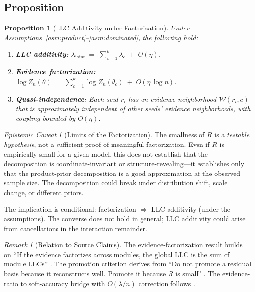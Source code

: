 \documentclass[11pt,a4paper]{article}
\newtheorem{proposition}[theorem]{Proposition}
\theoremstyle{definition}
\theoremstyle{remark}
\newtheorem{remark}[theorem]{Remark}
\newtheorem{caveat}[theorem]{Epistemic Caveat}
\newcommand{\LLC}{\lambda}
\newcommand{\cW}{\mathcal{W}}
\begin{document}
\subsection{Proposition}

\begin{proposition}[LLC Additivity under Factorization]\label{prop:llc-add}
  Under Assumptions~\ref{asm:product}--\ref{asm:dominated}, the following hold:
  \begin{enumerate}[label=(\alph*)]
    \item \textbf{LLC additivity:}
      $\displaystyle\LLC_{\mathrm{joint}} \;=\;
       \sum_{c=1}^{k} \LLC_c \;+\; O(\eta)$.
    \item \textbf{Evidence factorization:}
      $\displaystyle\log Z_n(\theta) \;=\;
       \sum_{c=1}^{k} \log Z_n(\theta_c) \;+\; O(\eta\,\log n)$.
    \item \textbf{Quasi-independence:} Each seed $r_i$ has an evidence
      neighborhood $\cW(r_i, c)$ that is approximately independent of other
      seeds' evidence neighborhoods, with coupling bounded by $O(\eta)$.
  \end{enumerate}
\end{proposition}

\begin{caveat}[Limits of the Factorization]\label{cav:claim1}
  The smallness of $R$ is a \emph{testable hypothesis}, not a sufficient proof
  of meaningful factorization.  Even if $R$ is empirically small for a given
  model, this does not establish that the decomposition is coordinate-invariant
  or structure-revealing---it establishes only that the product-prior
  decomposition is a good approximation at the observed sample size.  The
  decomposition could break under distribution shift, scale change, or
  different priors.

  The implication is conditional: factorization $\Rightarrow$ LLC additivity
  (under the assumptions).  The converse does not hold in general; LLC
  additivity could arise from cancellations in the interaction remainder.
\end{caveat}

\begin{remark}[Relation to Source Claims]\label{rem:claim1-sources}
  The evidence-factorization result builds on ``If the evidence factorizes
  across modules, the global LLC is the sum of module LLCs''
  \cite{Weakness-SL}.  The promotion criterion derives from ``Do not promote a
  residual basis because it reconstructs well.  Promote it because $R$ is
  small'' \cite{SLT-ResLayers}.  The evidence-ratio to soft-accuracy bridge
  with $O(\LLC/n)$ correction follows \cite{SLT-Accuracy}.
\end{remark}
\end{document}
